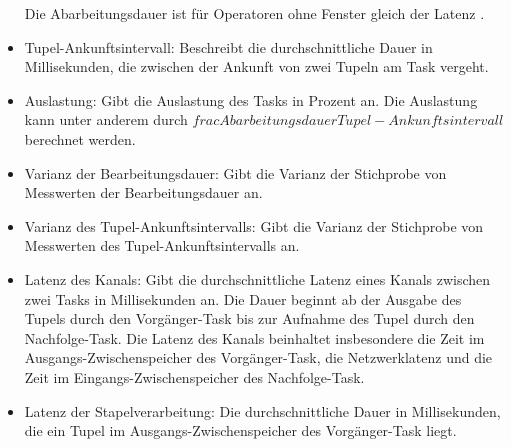 \begin{itemize}
{Die Abarbeitungsdauer ist für Operatoren ohne Fenster gleich der Latenz \cite{lohrmann_elastic_2015}.}
\item{Tupel-Ankunftsintervall: Beschreibt die durchschnittliche Dauer in Millisekunden, die zwischen der Ankunft von zwei Tupeln am Task vergeht.}
\item{Auslastung: Gibt die Auslastung des Tasks in Prozent an. Die Auslastung kann unter anderem durch \(frac{Abarbeitungsdauer}{Tupel-Ankunftsintervall}\) berechnet werden.}
\item{Varianz der Bearbeitungsdauer: Gibt die Varianz der Stichprobe von Messwerten der Bearbeitungsdauer an.}
\item{Varianz des Tupel-Ankunftsintervalls: Gibt die Varianz der Stichprobe von Messwerten des Tupel-Ankunftsintervalls an.}
\item{Latenz des Kanals: Gibt die durchschnittliche Latenz eines Kanals zwischen zwei Tasks in Millisekunden an. 
Die Dauer beginnt ab der Ausgabe des Tupels durch den Vorgänger-Task bis zur Aufnahme des Tupel durch den Nachfolge-Task.
Die Latenz des Kanals beinhaltet insbesondere die Zeit im Ausgangs-Zwischenspeicher des Vorgänger-Task, die Netzwerklatenz und die Zeit im Eingangs-Zwischenspeicher des Nachfolge-Task.}
\item{Latenz der Stapelverarbeitung: Die durchschnittliche Dauer in Millisekunden, die ein Tupel im Ausgangs-Zwischenspeicher des Vorgänger-Task liegt.}
\end{itemize}